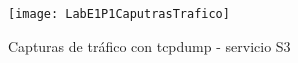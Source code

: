 \begin{figure}[ht!] 
\centering    
\texttt{[image: LabE1P1CaputrasTrafico]}
\caption[Capturas de tr\'afico con tcpdump - servicio S3]{Capturas de tr\'afico con tcpdump - servicio S3}
\label{fig:LabE1P1CapsTraf2}
\end{figure}



%
%
%
%
%
%


